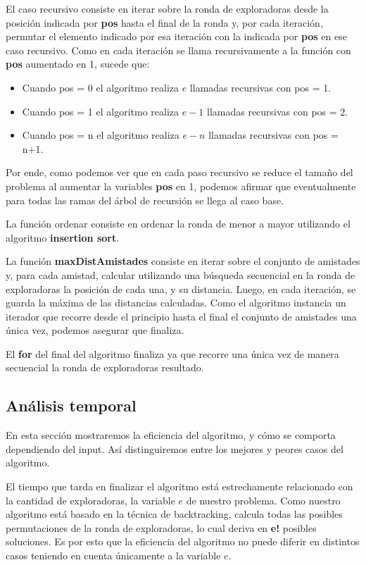 \documentclass[11pt]{article}
\begin{document}
El caso recursivo consiste en iterar sobre la ronda de exploradoras desde la posición indicada por \textbf{pos} 
hasta el final de la ronda y, por cada iteración, permutar el elemento indicado por esa iteración con la indicada por 
\textbf{pos} en ese caso recursivo. 
Como en cada iteración se llama recursivamente a la función con \textbf{pos} aumentado en 1, sucede que:

\begin{itemize}
\item Cuando pos = 0 el algoritmo realiza $e$ llamadas recursivas con pos = 1.
\item Cuando pos = 1 el algoritmo realiza $e-1$ llamadas recursivas con pos = 2.
\item Cuando pos = n el algoritmo realiza $e-n$ llamadas recursivas con pos = n+1.
\end{itemize}

Por ende, como podemos ver que en cada paso recursivo se reduce el tamaño del problema al aumentar la variables 
\textbf{pos} en 1, podemos afirmar que eventualmente para todas las ramas del árbol de recursión se llega al caso base.

La función ordenar consiste en ordenar la ronda de menor a mayor utilizando el algoritmo \textbf{insertion sort}.

La función \textbf{maxDistAmistades} consiste en iterar sobre el conjunto de amistades y, para cada amistad, 
calcular utilizando una búsqueda secuencial en la ronda de exploradoras la posición de cada una, y su distancia.
Luego, en cada iteración, se guarda la máxima de las distancias calculadas.
Como el algoritmo instancia un iterador que recorre desde el principio hasta el final el conjunto de amistades 
una única vez, podemos asegurar que finaliza.

El \textbf{for} del final del algoritmo finaliza ya que recorre una única vez de manera secuencial la ronda 
de exploradoras resultado.

\subsection{Análisis temporal}

En esta sección mostraremos la eficiencia del algoritmo, y cómo se comporta dependiendo del input. Así distinguiremos 
entre los mejores y peores casos del algoritmo.

El tiempo que tarda en finalizar el algoritmo está estrechamente relacionado con la cantidad de exploradoras, la variable $e$ de nuestro problema. Como nuestro algoritmo está basado en la técnica de backtracking, 
calcula todas las posibles permutaciones de la ronda de exploradoras, lo cual deriva en \textbf{e!} posibles soluciones.
Es por esto que la eficiencia del algoritmo no puede diferir en distintos casos teniendo en cuenta únicamente 
a la variable $e$.
\end{document}
